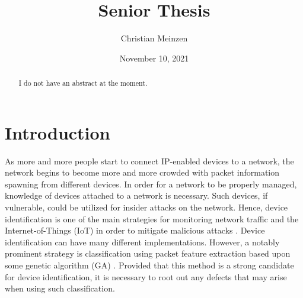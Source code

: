 \documentclass[11pt, titlepage]{article}
\title{Senior Thesis}
\author{Christian Meinzen}
\date{November 10, 2021}
\begin{document}
\maketitle
\tableofcontents
\clearpage

\def \Introduction {\section{Introduction}}
\label{section:intro}
\def \Note {\section{Notation and Metrics}}
\label{section:note}
\def \SysID {\section{Framework for SysID}}
\label{section:sysID}
\def \Mutate {\section{Framework for Mutation Module}}
\label{section:mutate}
\def \Proc {\section{Experimental Procedure}}
\label{section:proc}
\def \Results {\section{Experimental Results}}
\label{section:results}
\def \Conclusion {\section{Conclusion}}
\label{section:conclusion}
\def \Future {\section{Related and Future Works}}
\label{section:future}

\begin{abstract}
I do not have an abstract at the moment.
\end{abstract}


\Introduction
	As more and more people start to connect IP-enabled devices to a network, the network begins to become more and more crowded with packet information spawning from different devices. In order for a network to be properly managed, knowledge of devices attached to a network is necessary. Such devices, if vulnerable, could be utilized for insider attacks on the network. Hence, device identification is one of the main strategies for monitoring network traffic and the Internet-of-Things (IoT) in order to mitigate malicious attacks \cite{Sentinel}. Device identification can have many different implementations. However, a notably prominent strategy is classification using packet feature extraction based upon some genetic algorithm (GA) \cite{Network}. Provided that this method is a strong candidate for device identification, it is necessary to root out any defects that may arise when using such classification. 
\end{document}
